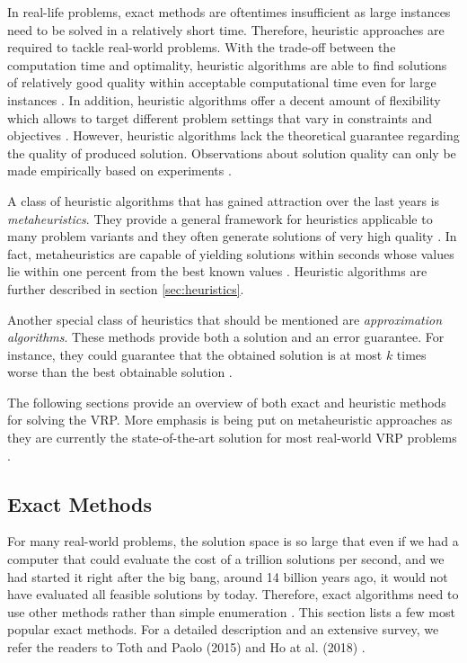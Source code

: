 In real-life problems, exact methods are oftentimes insufficient as large instances need to be solved in a relatively short time. Therefore, heuristic approaches are required to tackle real-world problems. With the trade-off between the computation time and optimality, heuristic algorithms are able to find solutions of relatively good quality within acceptable computational time even for large instances \cite{Peng2020}. In addition, heuristic algorithms offer a decent amount of flexibility which allows to target different problem settings that vary in constraints and objectives \cite{toth2015vrp}. However, heuristic algorithms lack the theoretical guarantee regarding the quality of produced solution. Observations about solution quality can only be made empirically based on experiments \cite{ropke-2005-phd, Peng2020}.

A class of heuristic algorithms that has gained attraction over the last years is \emph{metaheuristics}. They provide a general framework for heuristics applicable to many problem variants and they often generate solutions of very high quality \cite{ropke-2005-phd}. In fact, metaheuristics are capable of yielding solutions within seconds whose values lie within one percent from the best known values \cite{toth2015vrp}. Heuristic algorithms are further described in section \ref{sec:heuristics}.

Another special class of heuristics that should be mentioned are \emph{approximation algorithms}. These methods provide both a solution and an error guarantee. For instance, they could guarantee that the obtained solution is at most $k$ times worse than the best obtainable solution \cite{vazirani2001approximation}.


The following sections provide an overview of both exact and heuristic methods for solving the VRP. More emphasis is being put on metaheuristic approaches as they are currently the state-of-the-art solution for most real-world VRP problems \cite{toth2015vrp}.

\subsection{Exact Methods} \label{sec:exact-methods}

For many real-world problems, the solution space is so large that even if we had a computer that could evaluate the cost of a trillion solutions per second, and we had started it right after the big bang, around 14 billion years ago, it would not have evaluated all feasible solutions by today. Therefore, exact algorithms need to use other methods rather than simple enumeration \cite{ropke-2005-phd}. This section lists a few most popular exact methods. For a detailed description and an extensive survey, we refer the readers to Toth and Paolo (2015) \cite{toth2015vrp} and Ho at al. (2018) \cite{darp-survey}.

